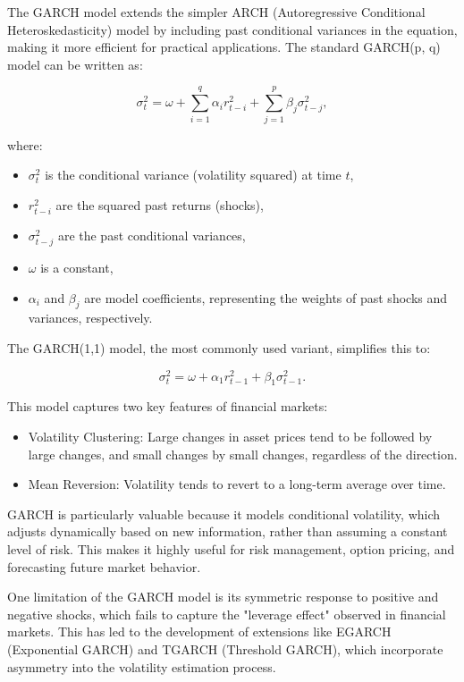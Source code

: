 \documentclass[letterpaper,11pt]{article}
\begin{document}
The GARCH model extends the simpler ARCH (Autoregressive Conditional Heteroskedasticity) model by including past conditional variances in the equation, making it more efficient for practical applications. The standard GARCH(p, q) model can be written as:

\[
\sigma_t^2 = \omega + \sum_{i=1}^q \alpha_i r_{t-i}^2 + \sum_{j=1}^p \beta_j \sigma_{t-j}^2,
\]

where:
\begin{itemize}
    \item \( \sigma_t^2 \) is the conditional variance (volatility squared) at time \( t \),
    \item \( r_{t-i}^2 \) are the squared past returns (shocks),
    \item \( \sigma_{t-j}^2 \) are the past conditional variances,
    \item \( \omega \) is a constant,
    \item \( \alpha_i \) and \( \beta_j \) are model coefficients, representing the weights of past shocks and variances, respectively.
\end{itemize}

The GARCH(1,1) model, the most commonly used variant, simplifies this to:

\[
\sigma_t^2 = \omega + \alpha_1 r_{t-1}^2 + \beta_1 \sigma_{t-1}^2.
\]

This model captures two key features of financial markets:
\begin{itemize}
    \item Volatility Clustering: Large changes in asset prices tend to be followed by large changes, and small changes by small changes, regardless of the direction.
    \item Mean Reversion: Volatility tends to revert to a long-term average over time.
\end{itemize}

GARCH is particularly valuable because it models conditional volatility, which adjusts dynamically based on new information, rather than assuming a constant level of risk. This makes it highly useful for risk management, option pricing, and forecasting future market behavior.

One limitation of the GARCH model is its symmetric response to positive and negative shocks, which fails to capture the "leverage effect" observed in financial markets. This has led to the development of extensions like EGARCH (Exponential GARCH) and TGARCH (Threshold GARCH), which incorporate asymmetry into the volatility estimation process.
\end{document}
